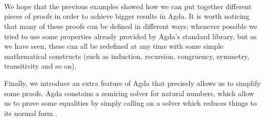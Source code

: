 {\begin{code}
\>[28][@{}l@{\AgdaIndent{0}}]%
\>[30]\AgdaSymbol{(}\AgdaSpace{}%
\AgdaSymbol{((}\AgdaSpace{}%
\AgdaOperator{\AgdaInductiveConstructor{,}}\AgdaSpace{}%
\AgdaSpace{}%
\AgdaSpace{}%
\AgdaSymbol{)}\AgdaSpace{}%
\AgdaSpace{}%
\AgdaSymbol{))}\<%
\\
%
\>[30]\AgdaSymbol{(}\AgdaSpace{}%
\AgdaSymbol{((}\AgdaSpace{}%
\AgdaOperator{\AgdaInductiveConstructor{,}}\AgdaSpace{}%
\AgdaSpace{}%
\AgdaSpace{}%
\AgdaSymbol{)}\AgdaSpace{}%
\AgdaSpace{}%
\AgdaSymbol{))}\<%
\\
%
\>[28]\AgdaSymbol{)}\<%
\\
\>[0]\<%
\end{code}

We hope that the previous examples showed how we can put together different pieces of proofs in order to achieve bigger results in Agda. It is worth noticing that many of these proofs can be defined in different ways; whenever possible we tried to use some properties already provided by Agda's standard library, but as we have seen, these can all be redefined at any time with some simple mathematical constructs (such as induction, recursion, congruency, symmetry, transitivity and so on).

Finally, we introduce an extra feature of Agda that precisely allows us to simplify some proofs. Agda constains a semiring solver for natural numbers, which allow us to prove some equalities by simply calling on a solver which reduces things to its normal form \cite{2018UsingSolver}.

\begin{code}%
\>[0]\AgdaSpace{}%
\<%
\\
\>[0]\AgdaSpace{}%
\<%
\\
\>[0][@{}l@{\AgdaIndent{0}}]%
\>[2]\AgdaSpace{}%
\AgdaSymbol{(}\AgdaSymbol{;}\AgdaSpace{}%
\AgdaSymbol{;}\AgdaSpace{}%
\AgdaOperator{\AgdaFunction{\AgdaUnderscore{}:=\AgdaUnderscore{}}}\AgdaSymbol{;}\AgdaSpace{}%
\AgdaSymbol{;}\AgdaSpace{}%
\AgdaSymbol{;}\AgdaSpace{}%
\AgdaOperator{\AgdaFunction{\AgdaUnderscore{}:+\AgdaUnderscore{}}}\AgdaSymbol{;}\AgdaSpace{}%
\AgdaOperator{\AgdaFunction{\AgdaUnderscore{}:*\AgdaUnderscore{}}}\AgdaSymbol{;}\AgdaSpace{}%
\AgdaOperator{\AgdaInductiveConstructor{:-\AgdaUnderscore{}}}\AgdaSymbol{;}\AgdaSpace{}%
\AgdaOperator{\AgdaFunction{\AgdaUnderscore{}:-\AgdaUnderscore{}}}\AgdaSymbol{)}\<%
\end{code}

}
